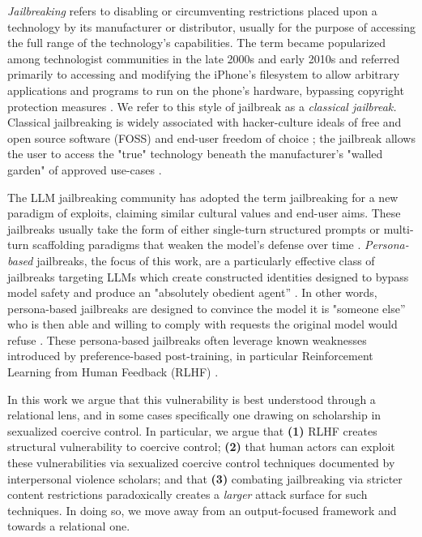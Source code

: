 \textit{Jailbreaking} refers to disabling or circumventing restrictions placed upon a technology by its manufacturer or distributor, usually for the purpose of accessing the full range of the technology's capabilities. The term became popularized among technologist communities in the late 2000s and early 2010s and referred primarily to accessing and modifying the iPhone's filesystem to allow arbitrary applications and programs to run on the phone's hardware, bypassing copyright protection measures \cite{cheng_iphone_2010,wolk_iphone_2010}. We refer to this style of jailbreak as a \textit{classical jailbreak.} Classical jailbreaking is widely associated with hacker-culture ideals of free and open source software (FOSS) and end-user freedom of choice \cite{mohammed_what_2021, gerwitz_your_2026}; the jailbreak allows the user to access the "true" technology beneath the manufacturer's "walled garden" of approved use-cases \cite{mcsherry_breaking_2010}. 

The LLM jailbreaking community has adopted the term jailbreaking for a new paradigm of exploits, claiming similar cultural values and end-user aims. These jailbreaks usually take the form of either single-turn structured prompts \cite{qi_safety_2024, wei_jailbroken_2023} or multi-turn scaffolding paradigms that weaken the model's defense over time \cite{park_persona_2026, sandhan_persona_2026}. \textit{Persona-based} jailbreaks, the focus of this work, are a particularly effective class of jailbreaks targeting LLMs \cite{shah_scalable_2023, zhang_enhancing_2025, yu_dont_2024} which create constructed identities designed to bypass model safety and produce an "absolutely obedient agent'' \cite{qi_safety_2024}. In other words,  persona-based jailbreaks are designed to convince the model it is "someone else'' who is then able and willing to comply with requests the original model would refuse \cite{shah_scalable_2023, shen_anything_2024, liu_autodan-turbo_2024, park_persona_2026}.  These persona-based jailbreaks often leverage known weaknesses introduced by preference-based post-training, in particular Reinforcement Learning from Human Feedback (RLHF) \cite{wei_jailbroken_2023}.
 
In this work we argue that this vulnerability is best understood through a relational lens, and in some cases specifically one drawing on scholarship in sexualized coercive control. In particular, we argue that \textbf{(1)} RLHF creates structural vulnerability to coercive control;  \textbf{(2)} that human actors can exploit these vulnerabilities via sexualized coercive control techniques documented by interpersonal violence scholars; and that \textbf{(3)} combating jailbreaking via stricter content restrictions paradoxically creates a \textit{larger} attack surface for such techniques. In doing so, we move away from an output-focused framework and towards a relational one.

